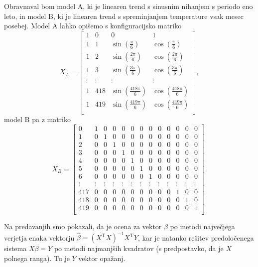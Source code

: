 \documentclass{article}
\begin{document}
Obravnaval bom model A, ki je linearen trend s sinusnim nihanjem s periodo eno
leto, in model B, ki je linearen trend s spreminjanjem temperature vsak mesec
posebej. Model A lahko opišemo s konfiguracijsko matriko
\[
    X_A =
    \left[ {\begin{array}{cccc}
        1 & 0 & 0 & 1\\
        1 & 1 & \sin(\frac{\pi}{6}) & \cos(\frac{\pi}{6})\\
        1 & 2 & \sin(\frac{2 \pi}{6}) & \cos(\frac{2 \pi}{6})\\
        1 & 3 & \sin(\frac{3 \pi}{6}) & \cos(\frac{3 \pi}{6})\\
        \vdots & \vdots & \vdots & \vdots\\
        1 & 418 & \sin(\frac{418 \pi}{6}) & \cos(\frac{418 \pi}{6})\\
        1 & 419 & \sin(\frac{419 \pi}{6}) & \cos(\frac{419 \pi}{6})\\
    \end{array} } \right],
\]
model B pa z matriko
\[
    X_B =
    \left[ {\begin{array}{ccccccccccccc}
        0 & 1 & 0 & 0 & 0 & 0 & 0 & 0 & 0 & 0 & 0 & 0 & 0\\
        1 & 0 & 1 & 0 & 0 & 0 & 0 & 0 & 0 & 0 & 0 & 0 & 0\\
        2 & 0 & 0 & 1 & 0 & 0 & 0 & 0 & 0 & 0 & 0 & 0 & 0\\
        3 & 0 & 0 & 0 & 1 & 0 & 0 & 0 & 0 & 0 & 0 & 0 & 0\\
        4 & 0 & 0 & 0 & 0 & 1 & 0 & 0 & 0 & 0 & 0 & 0 & 0\\
        5 & 0 & 0 & 0 & 0 & 0 & 1 & 0 & 0 & 0 & 0 & 0 & 0\\
        6 & 0 & 0 & 0 & 0 & 0 & 0 & 1 & 0 & 0 & 0 & 0 & 0\\
        \vdots & \vdots & \vdots & \vdots & \vdots & \vdots & \vdots & \vdots &
        \vdots & \vdots & \vdots & \vdots & \vdots\\
        417 & 0 & 0 & 0 & 0 & 0 & 0 & 0 & 0 & 0 & 1 & 0 & 0\\
        418 & 0 & 0 & 0 & 0 & 0 & 0 & 0 & 0 & 0 & 0 & 1 & 0\\
        419 & 0 & 0 & 0 & 0 & 0 & 0 & 0 & 0 & 0 & 0 & 0 & 1\\
    \end{array} } \right].
\]

Na predavanjih smo pokazali, da je ocena za vektor $\beta$ po metodi največjega
verjetja enaka vektorju $\hat{\beta} = \left( X^\mathrm{T} X\right)^{-1}
X^\mathrm{T} Y$, kar je natanko rešitev predoločenega sistema $X \beta = Y$ po
metodi najmanjših kvadratov (s predpostavko, da je $X$ polnega ranga). Tu je $Y$
vektor opažanj.
\end{document}
